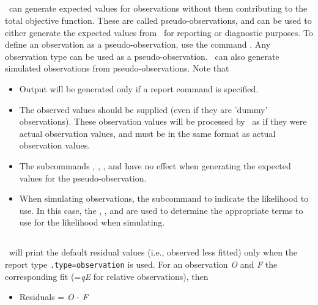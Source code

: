 \subsection{}\label{sec:PseudoObservations}

\CNAME\ can generate expected values for observations without them contributing to the total objective function. These are called pseudo-observations, and can be used to either generate the expected values from \CNAME\ for reporting or diagnostic purposes. To define an observation as a pseudo-observation, use the command . Any observation type can be used as a pseudo-observation. \CNAME\ can also generate simulated observations from pseudo-observations. Note that

\begin{itemize}
  \item Output will be generated only if a report command  is specified.
  \item The observed values should be supplied (even if they are 'dummy' observations). These observation values will be processed by \CNAME\ as if they were actual observation values, and must be in the same format as actual observation values.
  \item The subcommands , , , and  have no effect when generating the expected values for the pseudo-observation.
  \item When simulating observations, the subcommand  to indicate the likelihood to use. In this case, the , , and  are used to determine the appropriate terms to use for the likelihood when simulating.
\end{itemize}


\subsection{}\label{sec:Residuals}

\CNAME\ will print the default residual values (i.e., observed less fitted) only when the report type \texttt{.type=observation} is used. For an observation \textit{O} and \textit{F} the corresponding fit (=\textit{qE} for relative observations), then

\begin{itemize}
	\item Residuals = \textit{O} - \textit{F}
\end{itemize}


